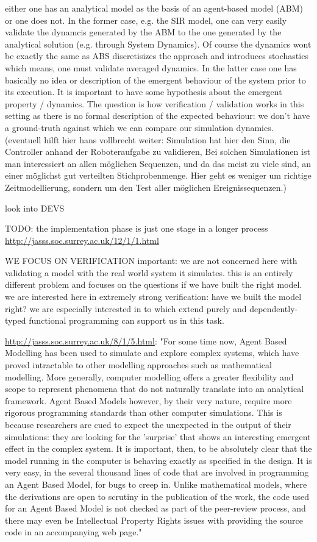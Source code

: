 either one has an analytical model as the basis of an agent-based model (ABM) or one does not.
In the former case, e.g. the SIR model, one can very easily validate the dynamcis generated by the ABM to the one generated by the analytical solution (e.g. through System Dynamics). Of course the dynamics wont be exactly the same as ABS discretisizes the approach and introduces stochastics which means, one must validate averaged dynamics.
In the latter case one has basically no idea or description of the emergent behaviour of the system prior to its execution. It is important to have some hypothesis about the emergent property / dynamics. The question is how verification / validation works in this setting as there is no formal description of the expected behaviour: we don't have a ground-truth against which we can compare our simulation dynamics. (eventuell hilft hier hans vollbrecht weiter: Simulation hat hier den Sinn, die Controller anhand der Roboteraufgabe zu validieren, Bei solchen Simulationen ist man interessiert an allen möglichen Sequenzen, und da das meist zu viele sind, an einer möglichst gut verteilten Stichprobenmenge. Hier geht es weniger um richtige Zeitmodellierung, sondern um den Test aller möglichen Ereignissequenzen.)

look into DEVS

TODO: the implementation phase is just one stage in a longer process \url{http://jasss.soc.surrey.ac.uk/12/1/1.html}

WE FOCUS ON VERIFICATION
important: we are not concerned here with validating a model with the real world system it simulates. this is an entirely different problem and focuses on the questions if we have built the right model.
we are interested here in extremely strong verification: have we built the model right? we are especially interested in to which extend purely and dependently-typed functional programming can support us in this task.

\url{http://jasss.soc.surrey.ac.uk/8/1/5.html}: "For some time now, Agent Based Modelling has been used to simulate and explore complex systems, which have proved intractable to other modelling approaches such as mathematical modelling. More generally, computer modelling offers a greater flexibility and scope to represent phenomena that do not naturally translate into an analytical framework. Agent Based Models however, by their very nature, require more rigorous programming standards than other computer simulations. This is because researchers are cued to expect the unexpected in the output of their simulations: they are looking for the 'surprise' that shows an interesting emergent effect in the complex system. It is important, then, to be absolutely clear that the model running in the computer is behaving exactly as specified in the design. It is very easy, in the several thousand lines of code that are involved in programming an Agent Based Model, for bugs to creep in. Unlike mathematical models, where the derivations are open to scrutiny in the publication of the work, the code used for an Agent Based Model is not checked as part of the peer-review process, and there may even be Intellectual Property Rights issues with providing the source code in an accompanying web page."

